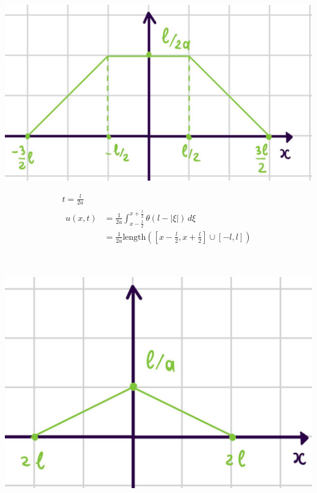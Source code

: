     \begin{minipage}{0.4\textwidth}
  \includegraphics[width=1\linewidth]{pictures/u7.jpg} 
    \end{minipage}
    \begin{minipage}{0.4\textwidth}\raggedleft
      \begin{gather*}
        t = \frac{l}{2a} \\
        \begin{split}
        u(x,t) &= \frac{1}{2a} \int_{x- \frac{l}{2}}^{x + \frac{l}{2}} \theta(l -|\xi| )\,d\xi \\
               &= \frac{1}{2a} \text{length}\left([x-\frac{l}{2},x+\frac{l}{2}]\cup [-l,l]\right)
        \end{split}
      \end{gather*}
    \end{minipage} \\
    \begin{minipage}{0.4\textwidth}
  \includegraphics[width=1\linewidth]{pictures/u8.jpg} 
    \end{minipage}
